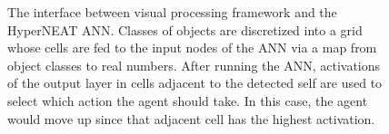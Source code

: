 \documentclass{sig-alternate}
\begin{document}
\begin{figure}
  \centering
  \hspace{.1in}
  \hspace{.1in}
  \hspace{.1in}
 \caption{The interface between visual processing framework and the HyperNEAT ANN. Classes of objects are discretized into a grid whose cells are fed to the input nodes of the ANN via a map from object classes to real numbers. After running the ANN, activations of the output layer in cells adjacent to the detected self are used to select which action the agent should take. In this case, the agent would move up since that adjacent cell has the highest activation.}
 \label{fig:interface}
\end{figure}
\end{document}
